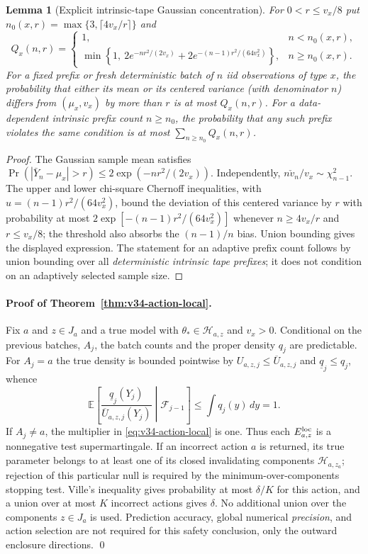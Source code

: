 \documentclass{article}
\theoremstyle{plain}
\newtheorem{lemma}[theorem]{Lemma}
\theoremstyle{definition}
\begin{document}
\begin{lemma}[Explicit intrinsic-tape Gaussian concentration]
\label{lem:v34-concentration}
For $0<r\le v_x/8$ put
$n_0(x,r)=\max\{3,\lceil4v_x/r\rceil\}$ and
\begin{equation}
 Q_x(n,r)=\begin{cases}
  1,&n<n_0(x,r),\\
  \min\!\left\{1,\ 2e^{-nr^2/(2v_x)}+
   2e^{-(n-1)r^2/(64v_x^2)}\right\},&n\ge n_0(x,r).
 \end{cases}
 \label{eq:v34-concentration-tail}
\end{equation}
For a fixed prefix or fresh deterministic batch of $n$ iid observations
of type $x$, the probability that either its mean or its centered
variance (with denominator $n$) differs from $(\mu_x,v_x)$ by more than
$r$ is at most $Q_x(n,r)$. For a data-dependent intrinsic prefix count
$n\ge n_0$, the probability that any such prefix violates the same
condition is at most $\sum_{n\ge n_0}Q_x(n,r)$.
\end{lemma}
\begin{proof}
The Gaussian sample mean satisfies
$\Pr(|\bar Y_n-\mu_x|>r)\le2\exp(-nr^2/(2v_x))$.
Independently, $n\check v_n/v_x\sim\chi^2_{n-1}$.
The upper and lower chi-square Chernoff inequalities, with
$u=(n-1)r^2/(64v_x^2)$, bound the deviation of this centered variance
by $r$ with probability at most
$2\exp[-(n-1)r^2/(64v_x^2)]$ whenever
$n\ge4v_x/r$ and $r\le v_x/8$; the threshold also absorbs the
$(n-1)/n$ bias. Union bounding gives the displayed expression.
The statement for an adaptive prefix count follows by union bounding
over all \emph{deterministic intrinsic tape prefixes}; it does not
condition on an adaptively selected sample size.
\end{proof}

\paragraph{Proof of Theorem~\ref{thm:v34-action-local}.}
Fix $a$ and $z\in J_a$ and a true model with
$\theta_*\in\mathcal H_{a,z}$ and $v_x>0$. Conditional on the previous
batches, $A_j$, the batch counts and the proper density $q_j$ are
predictable. For $A_j=a$ the true density is bounded pointwise by
$U_{a,z,j}\le\overline U_{a,z,j}$ and
$\underline q_j\le q_j$, whence
\[
 \mathbb E\!\left[\frac{\underline q_j(Y_j)}
 {\overline U_{a,z,j}(Y_j)}\middle|\mathcal F_{j-1}\right]
 \le\int q_j(y)\,dy=1.
\]
If $A_j\ne a$, the multiplier in \eqref{eq:v34-action-local} is one.
Thus each $E_{a,z}^{\rm loc}$ is a nonnegative test supermartingale.
If an incorrect action $a$ is returned, its true parameter belongs to
at least one of its closed invalidating components
$\mathcal H_{a,z_a}$; rejection of this particular null is required
by the minimum-over-components stopping test. Ville's inequality gives
probability at most $\delta/K$ for this action, and a union over at
most $K$ incorrect actions gives $\delta$. No additional union over
the components $z\in J_a$ is used. Prediction accuracy, global
numerical \emph{precision}, and action selection are not required for
this safety conclusion, only the outward enclosure directions.
\qed
\end{document}

